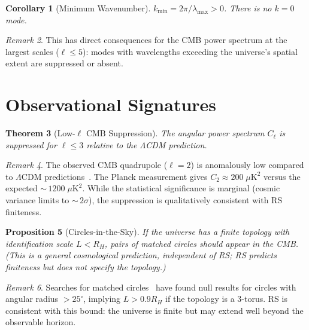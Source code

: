 \documentclass[12pt,a4paper]{article}
\newtheorem{theorem}{Theorem}[section]
\newtheorem{corollary}[theorem]{Corollary}
\newtheorem{proposition}[theorem]{Proposition}
\theoremstyle{definition}
\theoremstyle{remark}
\newtheorem{remark}[theorem]{Remark}
\begin{document}
\begin{corollary}[Minimum Wavenumber]
$k_{\min} = 2\pi/\lambda_{\max} > 0$.  There is no $k = 0$ mode.
\end{corollary}

\begin{remark}
This has direct consequences for the CMB power spectrum at the
largest scales ($\ell \leq 5$): modes with wavelengths exceeding the
universe's spatial extent are suppressed or absent.
\end{remark}

\section{Observational Signatures}
\label{sec:observations}

\begin{theorem}[Low-$\ell$ CMB Suppression]
The angular power spectrum $C_\ell$ is suppressed for $\ell \leq 3$
relative to the $\Lambda$CDM prediction.
\end{theorem}

\begin{remark}
The observed CMB quadrupole ($\ell = 2$) is anomalously low
compared to $\Lambda$CDM predictions~\cite{Planck2020}.  The
Planck measurement gives $C_2 \approx 200\;\mu\mathrm{K}^2$ versus
the expected ${\sim}\,1200\;\mu\mathrm{K}^2$.  While the statistical
significance is marginal (cosmic variance limits to ${\sim}\,2\sigma$),
the suppression is qualitatively consistent with RS finiteness.
\end{remark}

\begin{proposition}[Circles-in-the-Sky]
If the universe has a finite topology with identification scale
$L < R_H$, pairs of matched circles should appear in the CMB.
(This is a general cosmological prediction, independent of RS; RS
predicts finiteness but does not specify the topology.)
\end{proposition}

\begin{remark}
Searches for matched circles~\cite{Cornish2004} have found null
results for circles with angular radius $> 25^\circ$, implying
$L > 0.9 R_H$ if the topology is a 3-torus.  RS is consistent with
this bound: the universe is finite but may extend well beyond the
observable horizon.
\end{remark}
\end{document}
